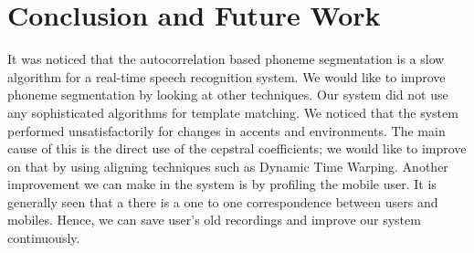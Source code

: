 \chapter{Conclusion and Future Work} \label{ch:conclusion}

It was noticed that the autocorrelation based phoneme segmentation is a slow algorithm for a real-time speech recognition system. We would like to improve phoneme segmentation by looking at other techniques. Our system did not use any sophisticated algorithms for template matching. We noticed that the system performed unsatisfactorily for changes in accents and environments. The main cause of this is the direct use of the cepstral coefficients; we would like to improve on that by using aligning techniques such as Dynamic Time Warping.
Another improvement we can make in the system is by profiling the mobile user. It is generally seen that a there is a one to one correspondence between users and mobiles. Hence, we can save user's old recordings and improve our system continuously.